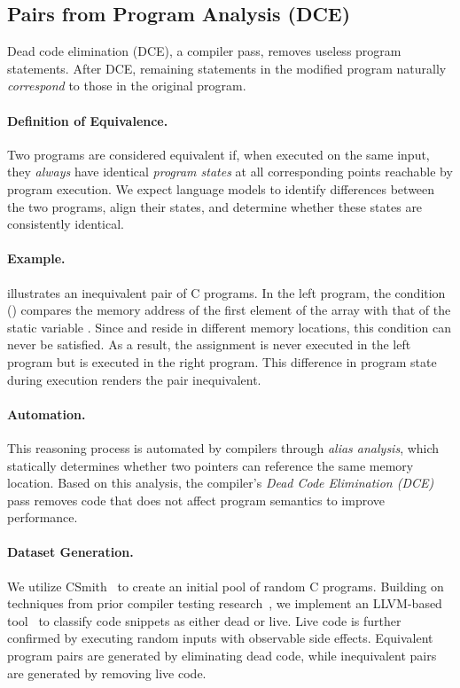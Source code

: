 \subsection{Pairs from Program Analysis (DCE)}
\label{subsec:dce}
Dead code elimination (DCE), a compiler pass, removes useless program statements. After DCE, remaining statements in the modified program naturally {\em correspond} to those in the original program.

\paragraph{Definition of Equivalence.} Two programs are considered equivalent if, when executed on the same input, they \emph{always} have identical \emph{program states} at all corresponding points reachable by program execution. We expect language models to identify differences between the two programs, align their states, and determine whether these states are consistently identical.

\paragraph{Example.}  illustrates an inequivalent pair of C programs. In the left program, the condition () compares the memory address of the first element of the array  with that of the static variable . Since  and  reside in different memory locations, this condition can never be satisfied. As a result, the assignment  is never executed in the left program but is executed in the right program. This difference in program state during execution renders the pair inequivalent.

\paragraph{Automation.} This reasoning process is automated by compilers through \emph{alias analysis}, which statically determines whether two pointers can reference the same memory location. Based on this analysis, the compiler’s \emph{Dead Code Elimination (DCE)} pass removes code that does not affect program semantics to improve performance.

\paragraph{Dataset Generation.} We utilize CSmith~\cite{yang2011finding} to create an initial pool of random C programs. Building on techniques from prior compiler testing research~\cite{theodoridis2022finding}, we implement an LLVM-based tool~\cite{lattner2004llvm} to classify code snippets as either dead or live. Live code is further confirmed by executing random inputs with observable side effects. Equivalent program pairs are generated by eliminating dead code, while inequivalent pairs are generated by removing live code.

